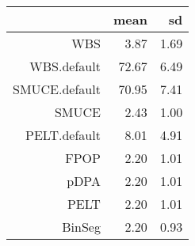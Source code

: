 \begin{tabular}{rrr}
  \hline
 & mean & sd \\ 
  \hline
WBS & 3.87 & 1.69 \\ 
  WBS.default & 72.67 & 6.49 \\ 
  SMUCE.default & 70.95 & 7.41 \\ 
  SMUCE & 2.43 & 1.00 \\ 
  PELT.default & 8.01 & 4.91 \\ 
  FPOP & 2.20 & 1.01 \\ 
  pDPA & 2.20 & 1.01 \\ 
  PELT & 2.20 & 1.01 \\ 
  BinSeg & 2.20 & 0.93 \\ 
   \hline
\end{tabular}
